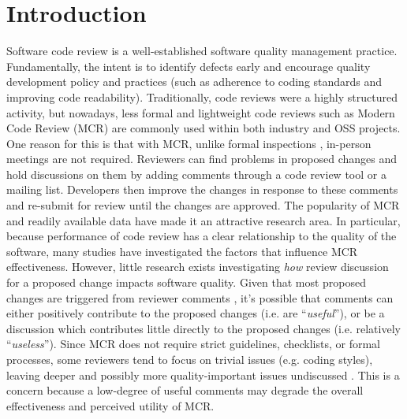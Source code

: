 
\section{Introduction}
Software code review is a well-established software quality management practice.
Fundamentally, the intent is to identify defects early and encourage quality development policy and practices (such as adherence to coding standards and improving code readability).
Traditionally, code reviews were a highly structured activity, but nowadays, less formal and lightweight code reviews such as Modern Code Review (MCR)\cite{Bacchelli2013a} are commonly used within both industry and OSS projects. 
One reason for this is that with MCR, unlike formal inspections \cite{Fagan:1976:DCI:1661010.1661012}, in-person meetings are not required.
Reviewers can find problems in proposed changes and hold discussions on them by adding comments through a code review tool or a mailing list.
Developers then improve the changes in response to these comments and re-submit for review until the changes are approved.  
The popularity of MCR and readily available data have made it an attractive research area.  
In particular, because performance of code review has a clear relationship to the quality of the software, many studies have investigated the factors that influence MCR\cite{Baysal2001,Mcintosh,Beller,Hamasaki2013} effectiveness.
However, little research exists investigating \emph{how} review discussion for a proposed change impacts software quality.
Given that most proposed changes are triggered from reviewer comments \cite{Beller}, 
it's possible that comments can either positively contribute to the proposed changes (i.e. are ``\emph{useful}''), or be a discussion which contributes little directly to the proposed changes (i.e. relatively ``\emph{useless}''). 
Since MCR does not require strict guidelines, checklists, or formal processes, some reviewers tend to focus on trivial issues (e.g. coding styles), leaving deeper and possibly more quality-important issues undiscussed \cite{Bacchelli2013a}.
This is a concern because a low-degree of useful comments may degrade the overall effectiveness and perceived utility of MCR.

